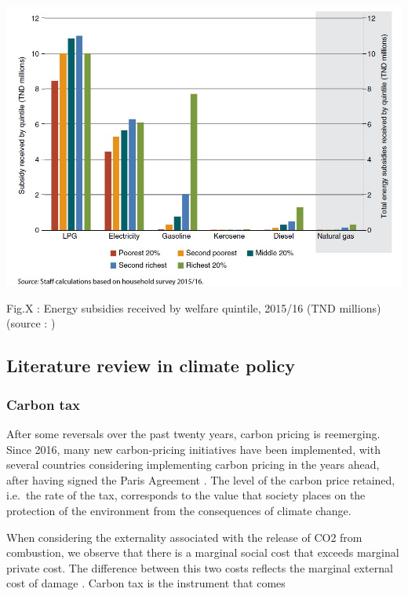 \documentclass[
]{article}
\begin{document}
\includegraphics{Images/Energy subsdies received by welfare quintile.jpg}

Fig.X : Energy subsidies received by welfare quintile, 2015/16 (TND
millions) (source : \textcite{tunisia2020})

\hypertarget{literature-review-in-climate-policy}{%
\subsection{Literature review in climate
policy}\label{literature-review-in-climate-policy}}

\hypertarget{carbon-tax}{%
\subsubsection{Carbon tax}\label{carbon-tax}}

After some reversals over the past twenty years, carbon pricing is
reemerging. Since 2016, many new carbon-pricing initiatives have been
implemented, with several countries considering implementing carbon
pricing in the years ahead, after having signed the Paris Agreement
\autocite{klenert2018}. The level of the carbon price retained, i.e.~the
rate of the tax, corresponds to the value that society places on the
protection of the environment from the consequences of climate
change\autocite{deperthuis2010}.

When considering the externality associated with the release of CO2 from
combustion, we observe that there is a marginal social cost that exceeds
marginal private cost. The difference between this two costs reflects
the marginal external cost of damage \autocite{goulder2013}. Carbon tax
is the instrument that comes
\end{document}
